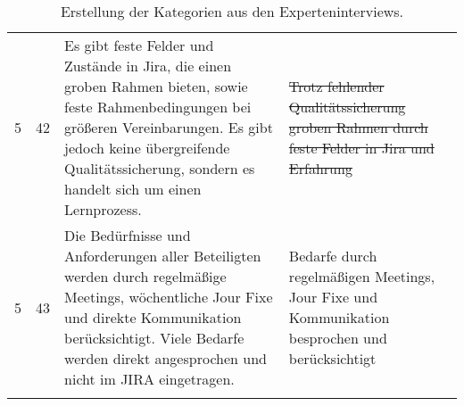 \begin{longtable}{| p{0.5cm} | p{0.5cm} | p{4cm} | p{4cm} | p{4cm} |}
	\cline{1-4}
	5 & 42 & Es gibt feste Felder und Zustände in Jira, die einen groben Rahmen bieten, sowie feste Rahmenbedingungen bei größeren Vereinbarungen. Es gibt jedoch keine übergreifende Qualitätssicherung, sondern es handelt sich um einen Lernprozess. & \st{Trotz fehlender Qualitätssicherung groben Rahmen durch feste Felder in Jira und Erfahrung} & \\ 
	\cline{1-4}
	5 & 43 & Die Bedürfnisse und Anforderungen aller Beteiligten werden durch regelmäßige Meetings, wöchentliche Jour Fixe und direkte Kommunikation berücksichtigt. Viele Bedarfe werden direkt angesprochen und nicht im JIRA eingetragen. & Bedarfe durch regelmäßigen Meetings, Jour Fixe und Kommunikation besprochen und berücksichtigt & \\ 
	\hline
	\caption{Erstellung der Kategorien aus den Experteninterviews.\label{tab:kategorien}}\\
\end{longtable}

